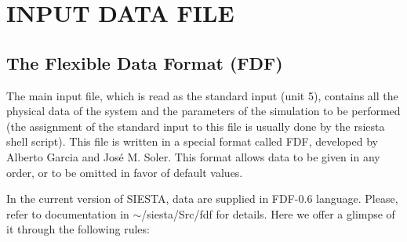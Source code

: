 


 
 
%
%

\section{INPUT DATA FILE}

\subsection{The Flexible Data Format (FDF)}

The main input file, which is read as the standard input (unit 5),
contains all the physical data of the system and the parameters of 
the simulation to be performed (the assignment of the standard
input to this file is usually done by the rsiesta shell script).
This file is written in a special format called FDF, developed by 
Alberto Garcia and Jos\'e M. Soler. This format allows data to be 
given in any order, or to be omitted in favor of default values.

In the current version of SIESTA, data are 
supplied in FDF-0.6 language.
Please, refer to documentation in $\sim$/siesta/Src/fdf for details.
Here we offer a glimpse of it through the following rules:

